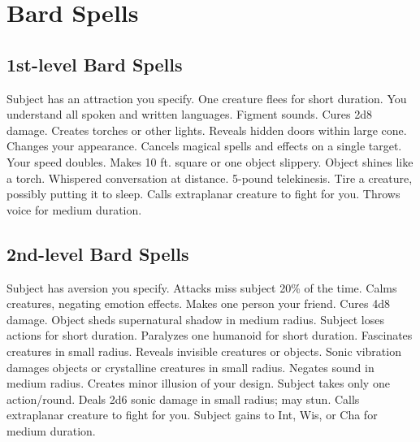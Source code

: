 \small

\section{Bard Spells}

\subsection{1st-level Bard Spells}
\begin{spelllist}
 Subject has an attraction you specify. 
 One creature flees for short duration.
 You understand all spoken and written languages.
 Figment sounds.
 Cures 2d8 damage.
 Creates torches or other lights.
 Reveals hidden doors within large cone.
 Changes your appearance.
 Cancels magical spells and effects on a single target.
 Your speed doubles.
 Makes 10 ft. square or one object slippery.
 Object shines like a torch.
 Whispered conversation at distance.
 5-pound telekinesis.
 Tire a creature, possibly putting it to sleep.
 Calls extraplanar creature to fight for you.
 Throws voice for medium duration.
\end{spelllist}

\subsection{2nd-level Bard Spells}
\begin{spelllist}
 Subject has aversion you specify.
 Attacks miss subject 20\% of the time.
 Calms creatures, negating emotion effects.
 Makes one person your friend. 
 Cures 4d8 damage.
 Object sheds supernatural shadow in medium radius.
 Subject loses actions for short duration.
 Paralyzes one humanoid for short duration.
 Fascinates creatures in small radius.
 Reveals invisible creatures or objects.
 Sonic vibration damages objects or crystalline creatures in small radius.
 Negates sound in medium radius.
 Creates minor illusion of your design.
 Subject takes only one action/round.
 Deals 2d6 sonic damage in small radius; may stun.
 Calls extraplanar creature to fight for you.
 Subject gains  to Int, Wis, or Cha for medium duration.
\end{spelllist}

